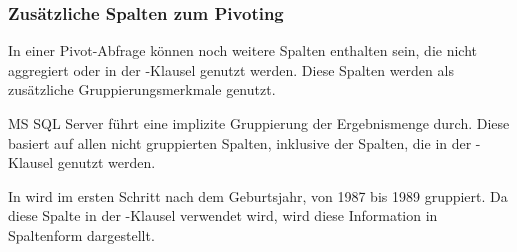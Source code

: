         \subsubsection{Zus\"atzliche Spalten zum Pivoting}
          In einer Pivot-Abfrage k\"onnen noch weitere Spalten enthalten sein, die nicht aggregiert oder in der -Klausel genutzt werden. Diese Spalten werden als zus\"atzliche Gruppierungsmerkmale genutzt.
          \begin{merke}
            MS SQL Server f\"uhrt eine implizite Gruppierung der Ergebnismenge durch. Diese basiert auf allen nicht gruppierten Spalten, inklusive der Spalten, die in der -Klausel genutzt werden.
          \end{merke}
          In  wird im ersten Schritt nach dem Geburtsjahr, von 1987 bis 1989 gruppiert. Da diese Spalte in der -Klausel verwendet wird, wird diese Information in Spaltenform dargestellt.

